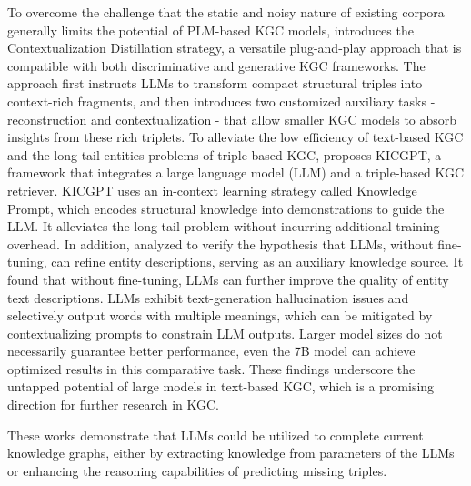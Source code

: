 To overcome the challenge that the static and noisy nature of existing corpora generally limits the potential of PLM-based KGC models, \cite{DBLP:conf/eacl/LiTCL24} introduces the Contextualization Distillation strategy, a versatile plug-and-play approach that is compatible with both discriminative and generative KGC frameworks. The approach first instructs LLMs to transform compact structural triples into context-rich fragments, and then introduces two customized auxiliary tasks - reconstruction and contextualization - that allow smaller KGC models to absorb insights from these rich triplets. 
To alleviate the low efficiency of text-based KGC and the long-tail entities problems of triple-based KGC, \cite{DBLP:conf/emnlp/WeiH0K23} proposes KICGPT, a framework that integrates a large language model (LLM) and a triple-based KGC retriever. KICGPT uses an in-context learning strategy called Knowledge Prompt, which encodes structural knowledge into demonstrations to guide the LLM. It alleviates the long-tail problem without incurring additional training overhead.
In addition, \cite{DBLP:journals/corr/abs-2310-08279} analyzed to verify the hypothesis that LLMs, without fine-tuning, can refine entity descriptions, serving as an auxiliary knowledge source. It found that without fine-tuning, LLMs can further improve the quality of entity text descriptions.  LLMs exhibit text-generation hallucination issues and selectively output words with multiple meanings, which can be mitigated by contextualizing prompts to constrain LLM outputs. Larger model sizes do not necessarily guarantee better performance, even the 7B model can achieve optimized results in this comparative task. These findings underscore the untapped potential of large models in text-based KGC, which is a promising direction for further research in KGC.


These works demonstrate that LLMs could be utilized to complete current knowledge graphs, either by extracting knowledge from parameters of the LLMs or enhancing the reasoning capabilities of predicting missing triples. 






